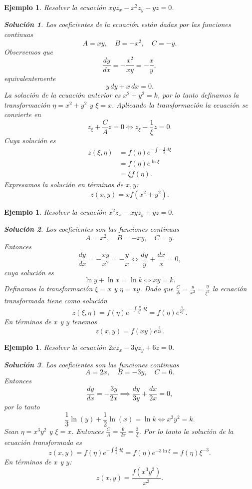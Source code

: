 \documentclass[11pt,letterpaper,draft]{report}
\newtheorem{example}[defn]{Ejemplo}
\newtheorem*{sol}{Solución}
\newcommand\<{\langle}
\renewcommand\>{\rangle}
\begin{document}
\begin{example}
  Resolver la ecuación $xy z_x - x^2 z_y - yz = 0$.
  \begin{sol}
    Los coeficientes de la ecuación están dadas por las
    funciones continuas
    \[
    A = xy, \quad B = -x^2, \quad C = -y.
    \] 
    Observemos que
    \[
    \frac{dy}{dx} = -\frac{x^2}{xy} = -\frac{x}{y},
    \] 
    equivalentemente
    \[
    y \, dy + x \, dx = 0.
    \] 
    La solución de la ecuación anterior es $x^2 + y^2 = k$,
    por lo tanto definamos la transformación $\eta = x^2 +
    y^2$ y $\xi = x$. Aplicando la transformación la
    ecuación se convierte en
    \[
    z_\xi + \frac{C}{A} z = 0 \iff z_\xi - \frac{1}{\xi} z =
    0.
    \]
    Cuya solución es
    \begin{align*}
      z(\xi,\eta) &= f(\eta)e^{-\int -\frac{1}{\xi} \,
      d\xi}\\
                  &= f(\eta)e^{\ln \xi}\\
                  &= \xi f(\eta).
    \end{align*} 
    Expresamos la solución en términos de $x,y$: 
    \[
      z(x,y) = xf(x^2+y^2).
    \] 
  \end{sol}
\end{example}

\begin{example}
  Resolver la ecuación $x^2 z_x - xy z_y + yz = 0.$
  \begin{sol}
    Los coeficientes son las funciones continuas
    \[
    A = x^2, \quad B = -xy, \quad C = y.
    \] 
    Entonces
    \[
    \frac{dy}{dx} = -\frac{xy}{x^2} = -\frac{y}{x} \iff
    \frac{dy}{y} + \frac{dx}{x} = 0,
    \] 
    cuya solución es
    \[
    \ln y + \ln x = \ln k \iff xy = k.
    \]
    Definamos la transformación $\xi = x$ y $\eta = xy$.
    Dado que $\frac{C}{A} = \frac{y}{x^2} =
    \frac{\eta}{\xi^3}$ la ecuación transformada tiene como
    solución
    \[
    z(\xi,\eta) = f(\eta)e^{-\int \frac{\eta}{\xi^3} \, d\xi} =
    f(\eta)e^{\frac{\eta}{2\xi^2}}.
    \] 
    En términos de $x$ y $y$ tenemos
    \[
    z(x,y) = f(xy)e^{\frac{y}{2x}}.
    \] 
  \end{sol}
\end{example}

\begin{example}
  Resolver la ecuación $2x z_x - 3y z_y + 6z = 0$.
  \begin{sol}
    Los coeficientes son las funciones continuas
    \[
    A = 2x, \quad B = -3y, \quad C = 6.
    \] 
    Entonces
    \[
    \frac{dy}{dx} = -\frac{3y}{2x} \implies \frac{dy}{3y} +
    \frac{dx}{2x} = 0,
    \]
    por lo tanto
    \[
    \frac{1}{3}\ln(y) + \frac{1}{2}\ln(x) = \ln k \iff
    x^3y^2 = k.
    \] 
    Sean $\eta = x^3 y^2$ y $\xi = x$. Entonces $\frac{C}{A}
    = \frac{6}{2x} = \frac{3}{\xi}$. Por lo tanto la
    solución de la ecuación transformada es
    \[
    z(x,y) = f(\eta)e^{-\int \frac{3}{\xi} \, d\xi} =
    f(\eta)e^{-3\ln \xi} = f(\eta) \xi^{-3}.
    \] 
    En términos de $x$ y $y$:
    \[
    z(x,y) = \frac{f(x^3y^2)}{x^3}.
    \] 
  \end{sol}
\end{example}
\end{document}
